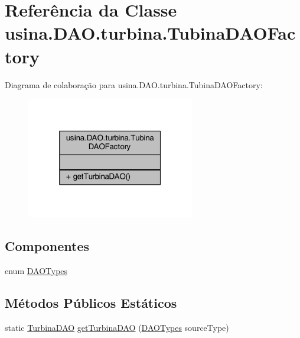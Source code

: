 \hypertarget{classusina_1_1_d_a_o_1_1turbina_1_1_tubina_d_a_o_factory}{\section{Referência da Classe usina.\-D\-A\-O.\-turbina.\-Tubina\-D\-A\-O\-Factory}
\label{classusina_1_1_d_a_o_1_1turbina_1_1_tubina_d_a_o_factory}
}


Diagrama de colaboração para usina.\-D\-A\-O.\-turbina.\-Tubina\-D\-A\-O\-Factory\-:\nopagebreak
\begin{figure}[H]
\begin{center}
\leavevmode
\includegraphics[width=208pt]{classusina_1_1_d_a_o_1_1turbina_1_1_tubina_d_a_o_factory__coll__graph}
\end{center}
\end{figure}
\subsection*{Componentes}
\begin{DoxyCompactItemize}
\item 
enum \hyperlink{enumusina_1_1_d_a_o_1_1turbina_1_1_tubina_d_a_o_factory_1_1_d_a_o_types}{D\-A\-O\-Types}
\end{DoxyCompactItemize}
\subsection*{Métodos Públicos Estáticos}
\begin{DoxyCompactItemize}
\item 
static \hyperlink{interfaceusina_1_1_d_a_o_1_1turbina_1_1_turbina_d_a_o}{Turbina\-D\-A\-O} \hyperlink{classusina_1_1_d_a_o_1_1turbina_1_1_tubina_d_a_o_factory_ad059e78604c0cad0e811022fce6609bc}{get\-Turbina\-D\-A\-O} (\hyperlink{enumusina_1_1_d_a_o_1_1turbina_1_1_tubina_d_a_o_factory_1_1_d_a_o_types}{D\-A\-O\-Types} source\-Type)
\end{DoxyCompactItemize}


